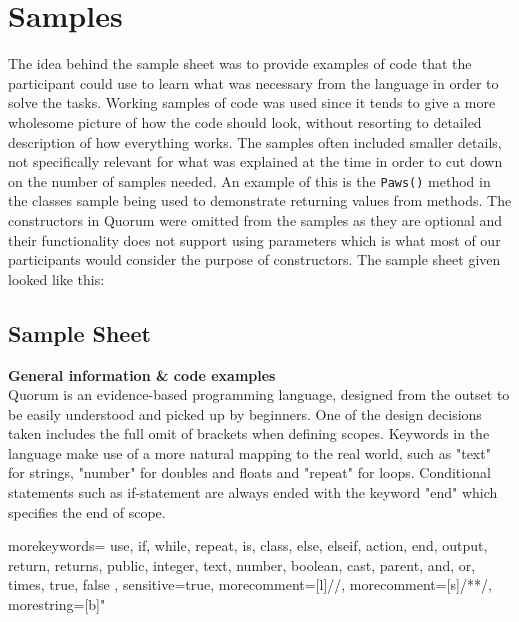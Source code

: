 \section{Samples}
The idea behind the sample sheet was to provide examples of code that the participant could use to learn what was necessary from the language in order to solve the tasks.
Working samples of code was used since it tends to give a more wholesome picture of how the code should look, without resorting to detailed description of how everything works.
The samples often included smaller details, not specifically relevant for what was explained at the time in order to cut down on the number of samples needed.
An example of this is the \lstinline!Paws()! method in the classes sample being used to demonstrate returning values from methods.
The constructors in Quorum were omitted from the samples as they are optional and their functionality does not support using parameters which is what most of our participants would consider the purpose of constructors.
The sample sheet given looked like this:%

\subsection{Sample Sheet}
\textbf{General information \& code examples}\\
Quorum is an evidence-based programming language, designed from the outset to be easily understood and picked up by beginners. One of the design decisions taken includes the full omit of brackets when defining scopes. Keywords in the language make use of a more natural mapping to the real world, such as "text" for strings, "number" for doubles and floats  and "repeat" for loops. Conditional statements such as if-statement are always ended with the keyword "end" which specifies the end of scope.

{
  morekeywords={
    use,
    if,
    while,
    repeat,
    is,
    class,
    else,
    elseif,
    action,
    end,
    output,
    return,
    returns,
    public,
    integer,
    text,
    number,
    boolean,
    cast,
    parent,
    and,
    or,
    times,
    true,
    false
  },
  sensitive=true, %
  morecomment=[l]{//}, %
  morecomment=[s]{/*}{*/}, %
  morestring=[b]" %
}

